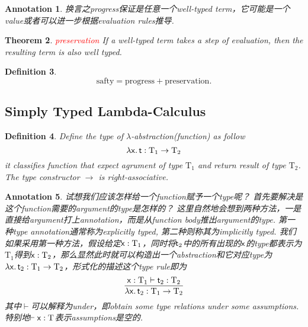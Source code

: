 \documentclass{article}
\theoremstyle{plain}
\newtheorem{theorem}{Theorem}
\newtheorem{definition}[theorem]{Definition}
\newtheorem{annotation}[theorem]{Annotation}
\theoremstyle{nonumberplain}
\newcommand{\lam}[2]{\ensuremath{\lambda #1\ldotp #2}} %
\newcommand{\singletype}[1]{\text{#1}}
\newcommand{\termtype}[2]{\ensuremath{#1:#2}}
\newcommand{\term}[1]{\ensuremath\mathsf{#1}}
\newcommand{\redt}[1]{\textcolor{red}{#1}}
\begin{document}
\begin{annotation}
\rm 换言之progress保证是任意一个well-typed term，它可能是一个value或者可以进一步根据evaluation rules推导. 
\end{annotation}


\begin{theorem}
\rm \redt{preservation} If a well-typed term takes a step of  evaluation, then the resulting term is also well typed. 
\end{theorem}

\begin{definition}
\rm
$$
\text{safty} = \text{progress} + \text{preservation}.
$$
\end{definition}


\newpage
\subsection{Simply Typed Lambda-Calculus}

\begin{definition}
\rm Define the type of $\lambda$-abstraction(function) as follow
$$
\termtype{\lam{\term{x}}{\term{t}}}{\singletype{T}_1 \to \singletype{T}_2}
$$
it classifies function that expect agrument of type $\singletype{T}_1$ and return result of type $\singletype{T}_2$. The type constructor $\to$ is right-associative. 
\end{definition}


\begin{annotation}
\rm 试想我们应该怎样给一个function赋予一个type呢？ 首先要解决是这个function需要的argument的type是怎样的？ 这里自然地会想到两种方法，一是直接给argument打上annotation，而是从function body推出argument的type. 第一种type annotation通常称为explicitly typed, 第二种则称其为implicitly typed. 我们如果采用第一种方法，假设给定$\termtype{\term{x}}{\singletype{T}_1}$，同时将$\term{t}_2$中的所有出现的$\term{x}$的type都表示为$\singletype{T}_1$得到$\termtype{\term{x}}{\singletype{T}_2}$，那么显然此时就可以构造出一个abstraction和它对应type为$\termtype{\lam{\term{x}}{\term{t}_2}}{\singletype{T}_1 \to \singletype{T}_2}$，形式化的描述这个type rule即为
$$
\infer{\termtype{\lam{\term{x}}{\term{t}_2}}{\singletype{T}_1 \to \singletype{T}_2}}{\termtype{\term{x}}{\singletype{T}_1} \vdash \termtype{\term{t}_2}{\singletype{T}_2}}
$$
其中$\vdash$可以解释为under，即obtain some type relations under some assumptions. 特别地$\vdash \termtype{\term{x}}{\singletype{T}}$表示assumptions是空的. 
\end{annotation}
\end{document}
